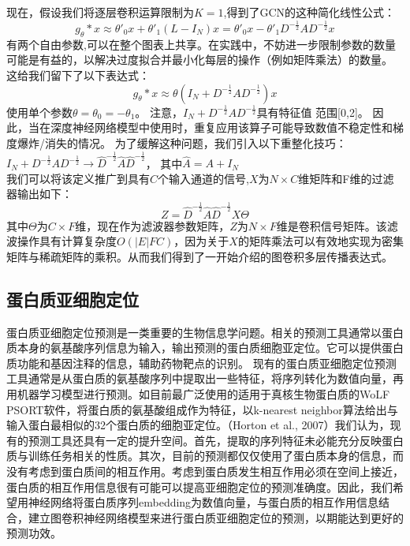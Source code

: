 \documentclass[a4paper,UTF8]{article}
\begin{document}
现在，假设我们将逐层卷积运算限制为$K = 1$,得到了GCN的这种简化线性公式：
$$g_\theta \ast x \approx \theta'_0x + \theta'_1(L-I_N)x=\theta'_0x-\theta'_1{D}^{-\frac{1}{2}} {A} {D}^{-\frac{1}{2}} x$$
有两个自由参数,可以在整个图表上共享。在实践中，不妨进一步限制参数的数量可能是有益的，以解决过度拟合并最小化每层的操作（例如矩阵乘法）的数量。 这给我们留下了以下表达式：
$$g_\theta \ast x \approx \theta \left(I_N+{D}^{-\frac{1}{2}} {A} {D}^{-\frac{1}{2}} \right)x$$
使用单个参数$\theta=\theta_0=-\theta_1$。 注意，$I_N+{D}^{-\frac{1}{2}} {A} {D}^{-\frac{1}{2}}$具有特征值
范围[0,2]。 因此，当在深度神经网络模型中使用时，重复应用该算子可能导致数值不稳定性和梯度爆炸/消失的情况。 为了缓解这种问题，我们引入以下重整化技巧：$I_N+{D}^{-\frac{1}{2}} {A} {D}^{-\frac{1}{2}} \rightarrow \hat{D}^{-\frac{1}{2}} \hat{A} \hat{D}^{-\frac{1}{2}}$， 其中$\hat{A}= A + I_N$\\

我们可以将该定义推广到具有$C$个输入通道的信号,$X$为$N×C$维矩阵和F维的过滤器输出如下：
$$Z = \hat{D}^{-\frac{1}{2}} \hat{A} \hat{D}^{-\frac{1}{2}} X \Theta $$
其中$\Theta $为$C×F$维，现在作为滤波器参数矩阵，$Z$为$N×F$维是卷积信号矩阵。该滤波操作具有计算复杂度$O(\vert E \vert FC)$，因为关于$X$的矩阵乘法可以有效地实现为密集矩阵与稀疏矩阵的乘积。从而我们得到了一开始介绍的图卷积多层传播表达式。

\subsection{蛋白质亚细胞定位}

蛋白质亚细胞定位预测是一类重要的生物信息学问题。相关的预测工具通常以蛋白质本身的氨基酸序列信息为输入，输出预测的蛋白质细胞亚定位。它可以提供蛋白质功能和基因注释的信息，辅助药物靶点的识别。
现有的蛋白质亚细胞定位预测工具通常是从蛋白质的氨基酸序列中提取出一些特征，将序列转化为数值向量，再用机器学习模型进行预测。如目前最广泛使用的适用于真核生物蛋白质的WoLF PSORT软件，将蛋白质的氨基酸组成作为特征，以k-nearest neighbor算法给出与输入蛋白最相似的32个蛋白质的细胞亚定位。（Horton et al., 2007）我们认为，现有的预测工具还具有一定的提升空间。首先，提取的序列特征未必能充分反映蛋白质与训练任务相关的性质。其次，目前的预测都仅仅使用了蛋白质本身的信息，而没有考虑到蛋白质间的相互作用。考虑到蛋白质发生相互作用必须在空间上接近，蛋白质的相互作用信息很有可能可以提高亚细胞定位的预测准确度。因此，我们希望用神经网络将蛋白质序列embedding为数值向量，与蛋白质的相互作用信息结合，建立图卷积神经网络模型来进行蛋白质亚细胞定位的预测，以期能达到更好的预测功效。\\
\end{document}
